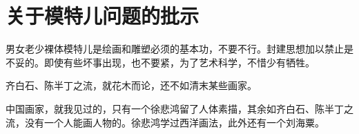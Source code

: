 \section[关于模特儿问题的批示（一九六五年七月十八日）]{关于模特儿问题的批示}


男女老少裸体模特儿是绘画和雕塑必须的基本功，不要不行。封建思想加以禁止是不妥的。即使有些坏事出现，也不要紧，为了艺术科学，不惜少有牺牲。

齐白石、陈半丁之流，就花木而论，还不如清末某些画家。

中国画家，就我见过的，只有一个徐悲鸿留了人体素描，其余如齐白石、陈半丁之流，没有一个人能画人物的。徐悲鸿学过西洋画法，此外还有一个刘海粟。

